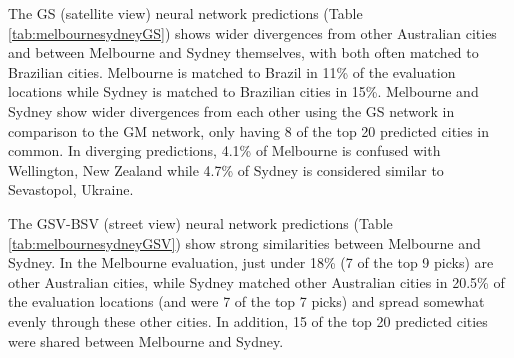\documentclass[urbansci,article,submit,moreauthors,pdftex]{Definitions/mdpi}
\begin{document}
The GS (satellite view) neural network predictions (Table \ref{tab:melbournesydneyGS}) shows wider divergences from other Australian cities and between Melbourne and Sydney themselves, with both often matched to Brazilian cities. Melbourne is matched to Brazil in 11\% of the evaluation locations while Sydney is matched to Brazilian cities in 15\%. Melbourne and Sydney show wider divergences from each other using the GS network in comparison to the GM network, only having 8 of the top 20 predicted cities in common. In diverging predictions, 4.1\% of Melbourne is confused with Wellington, New Zealand while 4.7\% of Sydney is considered similar to Sevastopol, Ukraine. 

The GSV-BSV (street view) neural network predictions (Table \ref{tab:melbournesydneyGSV}) show strong similarities between Melbourne and Sydney. In the Melbourne evaluation, just under 18\% (7 of the top 9 picks) are other Australian cities, while Sydney matched other Australian cities in 20.5\% of the evaluation locations (and were 7 of the top 7 picks) and spread somewhat evenly through these other cities. In addition, 15 of the top 20 predicted cities were shared between Melbourne and Sydney.
\end{document}
